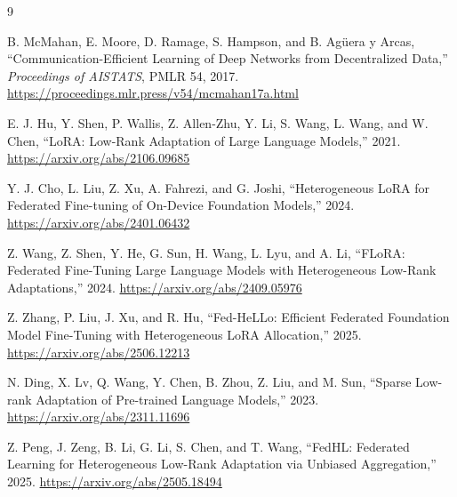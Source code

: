 \documentclass[11pt,a4paper]{article}
\begin{document}
\begin{thebibliography}{9}

B. McMahan, E. Moore, D. Ramage, S. Hampson, and B. Ag\"uera y Arcas,
``Communication-Efficient Learning of Deep Networks from Decentralized Data,''
\emph{Proceedings of AISTATS}, PMLR 54, 2017.
\url{https://proceedings.mlr.press/v54/mcmahan17a.html}

E. J. Hu, Y. Shen, P. Wallis, Z. Allen-Zhu, Y. Li, S. Wang, L. Wang, and
W. Chen, ``LoRA: Low-Rank Adaptation of Large Language Models,'' 2021.
\url{https://arxiv.org/abs/2106.09685}

Y. J. Cho, L. Liu, Z. Xu, A. Fahrezi, and G. Joshi,
``Heterogeneous LoRA for Federated Fine-tuning of On-Device Foundation
Models,'' 2024.
\url{https://arxiv.org/abs/2401.06432}

Z. Wang, Z. Shen, Y. He, G. Sun, H. Wang, L. Lyu, and A. Li,
``FLoRA: Federated Fine-Tuning Large Language Models with Heterogeneous
Low-Rank Adaptations,'' 2024.
\url{https://arxiv.org/abs/2409.05976}

Z. Zhang, P. Liu, J. Xu, and R. Hu,
``Fed-HeLLo: Efficient Federated Foundation Model Fine-Tuning with
Heterogeneous LoRA Allocation,'' 2025.
\url{https://arxiv.org/abs/2506.12213}

N. Ding, X. Lv, Q. Wang, Y. Chen, B. Zhou, Z. Liu, and M. Sun,
``Sparse Low-rank Adaptation of Pre-trained Language Models,'' 2023.
\url{https://arxiv.org/abs/2311.11696}

Z. Peng, J. Zeng, B. Li, G. Li, S. Chen, and T. Wang,
``FedHL: Federated Learning for Heterogeneous Low-Rank Adaptation via Unbiased
Aggregation,'' 2025.
\url{https://arxiv.org/abs/2505.18494}

\end{thebibliography}
\end{document}
